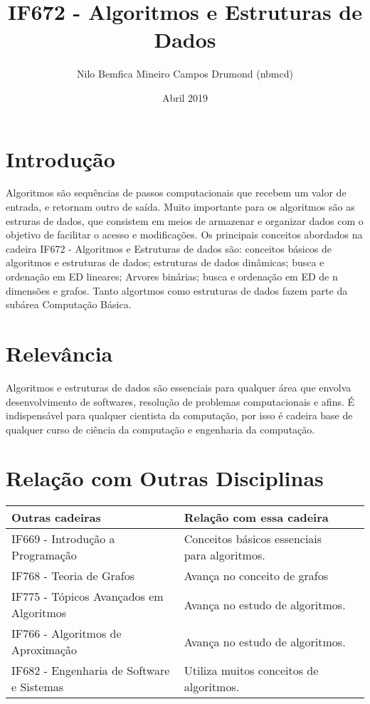 \documentclass[10pt]{article}
\title{IF672 - Algoritmos e Estruturas de Dados}
\author{Nilo Bemfica Mineiro Campos Drumond (nbmcd)}
\date{Abril 2019}
\begin{document}
\maketitle


\section{Introdução}
Algoritmos são sequências de passos computacionais que recebem um valor de entrada, e retornam outro de saída. Muito importante para os algoritmos são as estruras de dados, que consistem em meios de armazenar e organizar dados com o objetivo de facilitar o acesso e modificações\cite{algo}. Os principais conceitos abordados na cadeira IF672 - Algoritmos e Estruturas de dados são: conceitos básicos de algoritmos e estruturas de dados; estruturas de dados dinâmicas; busca e ordenação em ED lineares; Arvores binárias; busca e ordenação em ED de n dimensões e grafos\cite{cin-if672}. Tanto algortmos como estruturas de dados fazem parte da subárea Computação Básica\cite{subarea}.

\section{Relevância}
Algoritmos e estruturas de dados são essenciais para qualquer área que envolva desenvolvimento de softwares, resolução de problemas computacionais e afins. É indispensável para qualquer cientista da computação, por isso é cadeira base de qualquer curso de ciência da computação e engenharia da computação.

\section{Relação com Outras Disciplinas\cite{cc}}

\begin{tabular}{lll}
Outras cadeiras & Relação com essa cadeira \\ \hline
IF669 - Introdução a Programação          & Conceitos básicos essenciais para algoritmos. \\ \hline
IF768 - Teoria de Grafos                  & Avança no conceito de grafos
\\ \hline
IF775 - Tópicos Avançados em Algoritmos   & Avança no estudo de algoritmos.                                                                                                          \\ \hline
IF766 - Algoritmos de Aproximação         & Avança no estudo de algoritmos.                                                                                                      \\ \hline
IF682 - Engenharia de Software e Sistemas & Utiliza muitos conceitos de algoritmos.                                                                                                      \\
 \end{tabular}
 
\renewcommand\refname{Bibliografia}


\end{document}
